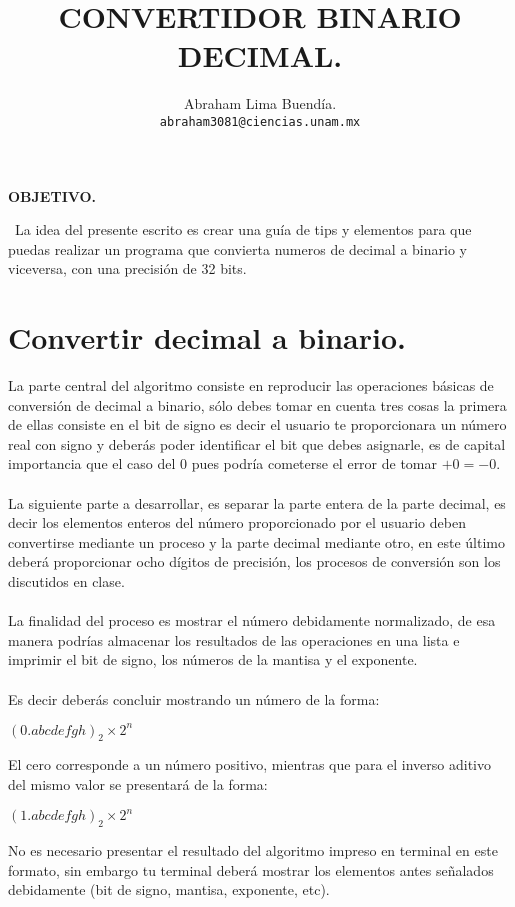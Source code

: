 \documentclass[12pt]{article}
\author{Abraham Lima Buendía. \\
\texttt{abraham3081@ciencias.unam.mx}}
\title{CONVERTIDOR BINARIO DECIMAL.}
\date{ }
\begin{document}
\renewcommand\labelenumii{\theenumi.{\arabic{enumii}}}
\maketitle
\fontsize{12}{12}\selectfont
\begin{center}
\fontsize{16}{16}\selectfont
\textbf{OBJETIVO.}
\end{center}
\
La idea del presente escrito es crear una guía de tips y elementos para que puedas realizar un programa que convierta numeros de decimal a binario y viceversa, con una precisión de 32 bits.
\section{Convertir decimal a binario.}
La parte central del algoritmo consiste en reproducir las operaciones básicas de conversión de decimal a binario, sólo debes tomar en cuenta tres cosas la primera de ellas consiste en el bit de signo es decir el usuario te proporcionara un número real con signo y deberás poder identificar el bit que debes asignarle, es de capital importancia que el caso del 0 pues podría cometerse el error de tomar $+0=-0$.
\\
\\
La siguiente parte a desarrollar, es separar la parte entera de la parte decimal, es decir los elementos enteros del número proporcionado por el usuario deben convertirse mediante un proceso y la parte decimal mediante otro, en este último deberá proporcionar ocho dígitos de precisión, los procesos de conversión son los discutidos en clase.
\\
\\
La finalidad del proceso es mostrar el número debidamente normalizado, de esa manera podrías almacenar los resultados de las operaciones en una lista e imprimir el bit de signo, los números de la mantisa y el exponente.
\\
\\
Es decir deberás concluir mostrando un número de la forma:
\begin{center}
${(0.abcdefgh)_2}\times2^{n}$
\end{center}
El cero corresponde a un número positivo, mientras que para el inverso aditivo del mismo valor se presentará de la forma:
\begin{center}
${(1.abcdefgh)_2}\times2^{n}$
\end{center}
No es necesario presentar el resultado del algoritmo impreso en terminal en este formato, sin embargo tu terminal deberá mostrar los elementos antes señalados debidamente (bit de signo, mantisa, exponente, etc).    
\end{document}

